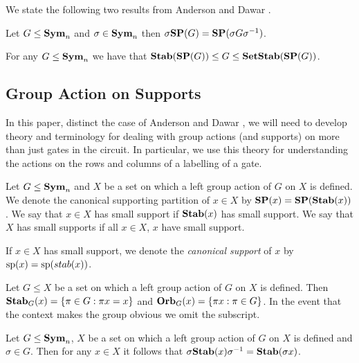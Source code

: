 \documentclass[../paper.tex]{subfiles}
\begin{document}
We state the following two results from Anderson and Dawar \cite{AndersonD17}.

\begin{lem}
  \label{lem:SP_conjugation}
  Let $G \leq \text{\textbf{Sym}}_n$ and $\sigma \in \text{\textbf{Sym}}_n$ then $\sigma \text{\textbf{SP}} (G) = \text{\textbf{SP}}(\sigma
  G \sigma^{-1})$.
\end{lem}

\begin{lem}
  For any $G \leq \text{\textbf{Sym}}_n$ we have that $\text{\textbf{Stab}} (\text{\textbf{SP}} (G)) \leq G \leq
  \text{\textbf{SetStab}}(\text{\textbf{SP}}(G))$.
\end{lem}

\subsection{Group Action on Supports}
In this paper, distinct the case of Anderson and Dawar \cite{AndersonD17}, we
will need to develop theory and terminology for dealing with group actions (and
supports) on more than just gates in the circuit. In particular, we use this
theory for understanding the actions on the rows and columns of a labelling of a
gate.

\begin{definition}
  Let $G \leq \text{\textbf{Sym}}_n$ and $X$ be a set on which a left group
  action of $G$ on $X$ is defined. We denote the canonical supporting partition
  of $x\in X$ by $\text{\textbf{SP}} (x) = \text{\textbf{SP}} (\text{\textbf{Stab}}(x))$. We say that $x \in X$ has small
  support if $\text{\textbf{Stab}}(x)$ has small support. We say that $X$ has small supports if
  all $x \in X$, $x$ have small support.

  If $x \in X$ has small support, we denote the \emph{canonical support} of $x$
  by $\text{sp}(x) = \text{sp} (stab(x))$.
\end{definition}

\begin{definition}
  Let $G \leq X$ be a set on which a left group action of $G$ on $X$
  is defined. Then $\text{\textbf{Stab}}_G (x) = \{\pi \in G : \pi x = x\}$ and $\text{\textbf{Orb}}_G (x) =
  \{\pi x : \pi \in G\}$. In the event that the context makes the group obvious
  we omit the subscript.
\end{definition}

\begin{lem}
  \label{lem:stab_conjugation}
  Let $G \leq \text{\textbf{Sym}}_n$, $X$ be a set on which a left group action
  of $G$ on $X$ is defined and $\sigma \in G$. Then for any $x \in X$ it follows
  that $\sigma \text{\textbf{Stab}} (x) \sigma^{-1} = \text{\textbf{Stab}}(\sigma x)$.
\end{lem}
\end{document}
